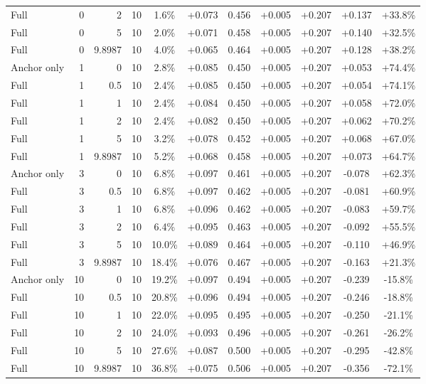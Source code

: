 \begin{table}[htbp]
\begin{tabular}{lrrrccccccc}
Full & 0 & 2 & 10 & 1.6\% & +0.073 & 0.456 & +0.005 & +0.207 & +0.137 & +33.8\% \\
Full & 0 & 5 & 10 & 2.0\% & +0.071 & 0.458 & +0.005 & +0.207 & +0.140 & +32.5\% \\
Full & 0 & 9.8987 & 10 & 4.0\% & +0.065 & 0.464 & +0.005 & +0.207 & +0.128 & +38.2\% \\
Anchor only & 1 & 0 & 10 & 2.8\% & +0.085 & 0.450 & +0.005 & +0.207 & +0.053 & +74.4\% \\
Full & 1 & 0.5 & 10 & 2.4\% & +0.085 & 0.450 & +0.005 & +0.207 & +0.054 & +74.1\% \\
Full & 1 & 1 & 10 & 2.4\% & +0.084 & 0.450 & +0.005 & +0.207 & +0.058 & +72.0\% \\
Full & 1 & 2 & 10 & 2.4\% & +0.082 & 0.450 & +0.005 & +0.207 & +0.062 & +70.2\% \\
Full & 1 & 5 & 10 & 3.2\% & +0.078 & 0.452 & +0.005 & +0.207 & +0.068 & +67.0\% \\
Full & 1 & 9.8987 & 10 & 5.2\% & +0.068 & 0.458 & +0.005 & +0.207 & +0.073 & +64.7\% \\
Anchor only & 3 & 0 & 10 & 6.8\% & +0.097 & 0.461 & +0.005 & +0.207 & -0.078 & +62.3\% \\
Full & 3 & 0.5 & 10 & 6.8\% & +0.097 & 0.462 & +0.005 & +0.207 & -0.081 & +60.9\% \\
Full & 3 & 1 & 10 & 6.8\% & +0.096 & 0.462 & +0.005 & +0.207 & -0.083 & +59.7\% \\
Full & 3 & 2 & 10 & 6.4\% & +0.095 & 0.463 & +0.005 & +0.207 & -0.092 & +55.5\% \\
Full & 3 & 5 & 10 & 10.0\% & +0.089 & 0.464 & +0.005 & +0.207 & -0.110 & +46.9\% \\
Full & 3 & 9.8987 & 10 & 18.4\% & +0.076 & 0.467 & +0.005 & +0.207 & -0.163 & +21.3\% \\
Anchor only & 10 & 0 & 10 & 19.2\% & +0.097 & 0.494 & +0.005 & +0.207 & -0.239 & -15.8\% \\
Full & 10 & 0.5 & 10 & 20.8\% & +0.096 & 0.494 & +0.005 & +0.207 & -0.246 & -18.8\% \\
Full & 10 & 1 & 10 & 22.0\% & +0.095 & 0.495 & +0.005 & +0.207 & -0.250 & -21.1\% \\
Full & 10 & 2 & 10 & 24.0\% & +0.093 & 0.496 & +0.005 & +0.207 & -0.261 & -26.2\% \\
Full & 10 & 5 & 10 & 27.6\% & +0.087 & 0.500 & +0.005 & +0.207 & -0.295 & -42.8\% \\
Full & 10 & 9.8987 & 10 & 36.8\% & +0.075 & 0.506 & +0.005 & +0.207 & -0.356 & -72.1\% \\

\end{tabular}
\end{table}
